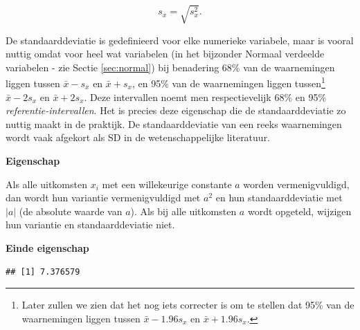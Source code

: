 \documentclass[
  12pt,dutch]{book}
\newenvironment{Shaded}{\begin{snugshade}}{\end{snugshade}}
\newcommand{\AttributeTok}[1]{\textcolor[rgb]{0.13,0.29,0.53}{#1}}
\newcommand{\CommentTok}[1]{\textcolor[rgb]{0.56,0.35,0.01}{\textit{#1}}}
\newcommand{\ConstantTok}[1]{\textcolor[rgb]{0.56,0.35,0.01}{#1}}
\newcommand{\FunctionTok}[1]{\textcolor[rgb]{0.13,0.29,0.53}{\textbf{#1}}}
\newcommand{\NormalTok}[1]{#1}
\newcommand{\SpecialCharTok}[1]{\textcolor[rgb]{0.81,0.36,0.00}{\textbf{#1}}}
\theoremstyle{definition}
\theoremstyle{definition}
\theoremstyle{definition}
\theoremstyle{definition}
\theoremstyle{remark}
\begin{document}
\begin{equation*}
s_x= \sqrt{s_x^2} .
\end{equation*}

De standaarddeviatie is gedefinieerd voor elke numerieke variabele, maar is
vooral nuttig omdat voor heel wat variabelen (in het bijzonder Normaal
verdeelde variabelen - zie Sectie \ref{sec:normal}) bij benadering 68\% van
de waarnemingen liggen tussen \(\bar{x} - s_x\) en \(\bar{x} + s_x\), en 95\%
van de waarnemingen liggen tussen\footnote{Later zullen we zien dat het nog iets correcter is om te stellen dat 95\% van de waarnemingen liggen tussen \(\bar{x} - 1.96 s_x\) en \(\bar{x} + 1.96 s_x\).}
\(\bar{x} - 2 s_x\) en \(\bar{x} + 2 s_x\). Deze intervallen noemt men respectievelijk 68\% en 95\% \emph{referentie-intervallen}. Het is precies deze eigenschap die de
standaarddeviatie zo nuttig maakt in de praktijk. De standaarddeviatie van
een reeks waarnemingen wordt vaak afgekort als SD in de wetenschappelijke literatuur.

\textbf{Eigenschap}

Als alle uitkomsten \(x_i\) met een willekeurige constante \(a\)
worden vermenigvuldigd, dan wordt hun variantie vermenigvuldigd met \(a^2\) en
hun standaarddeviatie met \(|a|\) (de absolute waarde van \(a\)). Als bij alle
uitkomsten \(a\) wordt opgeteld, wijzigen hun variantie en standaarddeviatie
niet.

\textbf{Einde eigenschap}

\begin{Shaded}
\end{Shaded}

\begin{verbatim}
## [1] 7.376579
\end{verbatim}

\begin{Shaded}
\end{Shaded}
\end{document}
